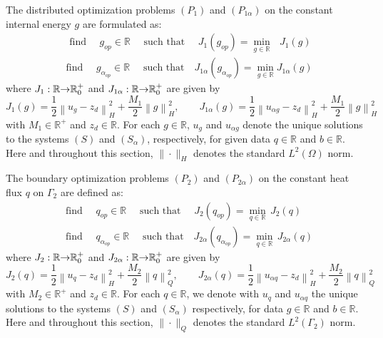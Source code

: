 \documentclass[axioms,article,submit,moreauthors]{Definitions/mdpi}
\begin{document}
The distributed optimization problems $(P_1)$ and $(P_{1\alpha})$ on the constant internal energy $g$ are formulated as:
\begingroup
\addtolength{\jot}{0.5em}
\begin{align}
& \text{ find }\quad g_{op}\in \mathbb{R}\quad\text{ such that }\quad
J_{1}(g_{op})=\min\limits_{g\in \mathbb{R}} \text{ }J_{1}(g)
\label{PControlJ1} \\
& \text{find }\quad g_{{\alpha}_{op}}\in \mathbb{R}\quad\text{ such that
}\quad J_{1\alpha}(g_{{\alpha}_{op}})=\min\limits_{g\in \mathbb{R}} \text{
}J_{1\alpha}(g)  \label{PControlalfaJ1}
\end{align}
\endgroup
where $J_{1}:\mathbb{R}{\rightarrow}{\Bbb R}_{0}^{+}$ and
$J_{1\alpha}:\mathbb{R}{\rightarrow}{\Bbb R}_{0}^{+}$ are given by
\begin{equation} \label{J1-J1alpha}
J_{1}(g)=\frac{1}{2}\left\|u_{g}-z_{d}\right\|
_{H}^{2}+\frac{M_{1}}{2}\left\| g\right\|_{H}^{2},\qquad J_{1\alpha}(g)=\frac{1}{2}\left\|u_{\alpha
g}-z_{d}\right\| _{H}^{2}+\frac{M_{1}}{2}\left\| g\right\|_{H}^{2}
\end{equation}
with $M_{1}\in\mathbb{R}^+$ and $z_{d}\in \mathbb{R}$. { For each $g \in \mathbb{R}$, $u_g$ and $u_{\alpha g}$ denote the unique solutions to the systems $(S)$ and $(S_\alpha)$, respectively, for given data $q \in \mathbb{R}$ and $b \in \mathbb{R}$.  }
{ Here and throughout this section, $\|\cdot\|_H$ denotes the standard $L^2(\Omega)$ norm.}

The boundary optimization problems $(P_2)$ and $(P_{2\alpha})$ on the constant heat flux $q$ on $\Gamma_{2}$ are defined as:
\begingroup
\addtolength{\jot}{0.5em}
\begin{align}
& \text{find }\quad q_{op}\in \mathbb{R}\quad\text{ such that }\quad
J_{2}(q_{op})=\min\limits_{q\in \mathbb{R}}\,J_{2}(q) \label{PControlJ2} \\
& \text{find }\quad q_{{\alpha}_{op}}\in \mathbb{R}\quad\text{ such that
}\quad J_{2\alpha}(q_{{\alpha}_{op}})=\min\limits_{q\in\mathbb{R}}\,J_{2\alpha}(q)  \label{PControlalfaJ2}
\end{align}
\endgroup
where 
$J_{2}:\mathbb{R}{\rightarrow}{\Bbb R}_{0}^{+}$ and
$J_{2\alpha}:\mathbb{R}{\rightarrow}{\Bbb R}_{0}^{+}$ are given by
\begin{equation}\label{J2-J2alpha}
J_{2}(q)=\frac{1}{2}\left\| u_{q}-z_{d}\right\|
_{H}^{2}+\frac{M_{2}}{2}\left\| q\right\|_{Q}^{2}, \qquad
J_{2\alpha}(q)=\frac{1}{2}\left\| u_{\alpha
q}-z_{d}\right\| _{H}^{2}+\frac{M_{2}}{2}\left\| q\right\|_{Q}^{2}
\end{equation}
with $M_2\in\mathbb{R}^+$ and $z_d\in
\mathbb{R}$. For each $q\in\mathbb{R}$,  we denote with $u_{q}$ and $u_{\alpha q}$  the unique solutions to the
systems $(S)$ and $(S_\alpha)$ respectively,  for data $g\in \mathbb{R}$ and $b\in \mathbb{R}$. 
{ Here and throughout this section, $\|\cdot\|_Q$ denotes the standard $L^2(\Gamma_2)$ norm.}
\end{document}
